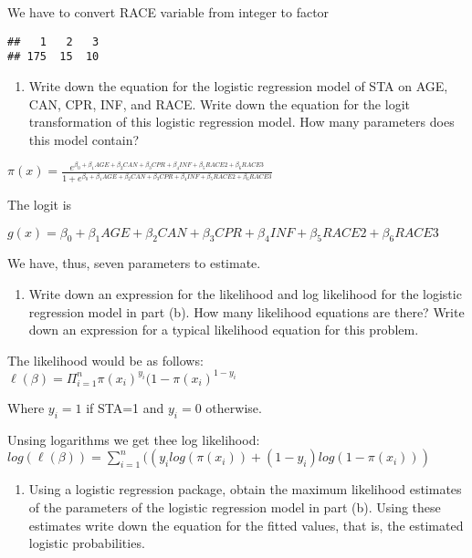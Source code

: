 \documentclass[]{article}
\begin{document}
We have to convert RACE variable from integer to factor

\begin{verbatim}
##   1   2   3 
## 175  15  10
\end{verbatim}

\begin{enumerate}
\def\labelenumi{\alph{enumi}.}
\setcounter{enumi}{1}
\itemsep1pt\parskip0pt
\item
  Write down the equation for the logistic regression model of STA on
  AGE, CAN, CPR, INF, and RACE. Write down the equation for the logit
  transformation of this logistic regression model. How many parameters
  does this model contain?
\end{enumerate}

$\pi(x)=\frac{e^{\beta_0+\beta_{1}AGE+\beta_{2}CAN+\beta_{3}CPR+\beta_{4}INF+\beta_{5}RACE2+\beta_{6}RACE3}}{1+e^{\beta_0+\beta_{1}AGE+\beta_{2}CAN+\beta_{3}CPR+\beta_{4}INF+\beta_{5}RACE2+\beta_{6}RACE3}}$

The logit is

$g(x)=\beta_0+\beta_{1}AGE+\beta_{2}CAN+\beta_{3}CPR+\beta_{4}INF+\beta_{5}RACE2+\beta_{6}RACE3$

We have, thus, seven parameters to estimate.

\begin{enumerate}
\def\labelenumi{\alph{enumi}.}
\setcounter{enumi}{2}
\itemsep1pt\parskip0pt
\item
  Write down an expression for the likelihood and log likelihood for the
  logistic regression model in part (b). How many likelihood equations
  are there? Write down an expression for a typical likelihood equation
  for this problem.
\end{enumerate}

The likelihood would be as
follows:\\$\ell(\beta)=\Pi_{i=1}^{n}\pi(x_i)^{y_i}(1-\pi(x_i)^{1-y_i}$

Where $y_i=1$ if STA=1 and $y_i=0$ otherwise.

Unsing logarithms we get thee log
likelihood:\\$log(\ell(\beta))=\sum_{i=1}^n((y_ilog(\pi(x_i))+(1-y_i)log(1-\pi(x_i)))$

\begin{enumerate}
\def\labelenumi{\alph{enumi}.}
\setcounter{enumi}{3}
\itemsep1pt\parskip0pt
\item
  Using a logistic regression package, obtain the maximum likelihood
  estimates of the parameters of the logistic regression model in part
  (b). Using these estimates write down the equation for the fitted
  values, that is, the estimated logistic probabilities.
\end{enumerate}
\end{document}
